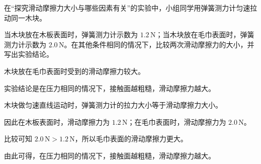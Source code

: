 
\begin{problem}
在“探究滑动摩擦力大小与哪些因素有关”的实验中，小组同学用弹簧测力计匀速拉动同一木块。

当木块放在木板表面时，弹簧测力计示数为 $1.2\,\mathrm{N}$；当木块放在毛巾表面时，弹簧测力计示数为 $2.0\,\mathrm{N}$。在其他条件相同的情况下，比较两次滑动摩擦力的大小，并写出实验结论。
\end{problem}

\begin{answer}
木块放在毛巾表面时受到的滑动摩擦力较大。

实验结论是在压力相同的情况下，接触面越粗糙，滑动摩擦力越大。
\end{answer}

\begin{solutions}
木块做匀速直线运动时，弹簧测力计的拉力大小等于滑动摩擦力大小。

因此在木板表面时，滑动摩擦力为 $1.2\,\mathrm{N}$；在毛巾表面时，滑动摩擦力为 $2.0\,\mathrm{N}$。

比较可知 $2.0\,\mathrm{N}>1.2\,\mathrm{N}$，所以毛巾表面的滑动摩擦力更大。

由此可得，在压力相同的情况下，接触面越粗糙，滑动摩擦力越大。
\end{solutions}
